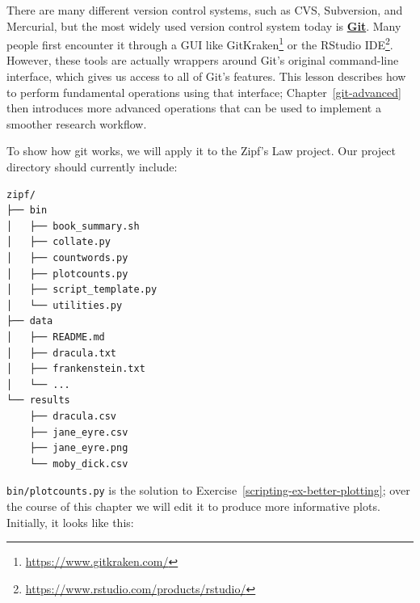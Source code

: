 \documentclass[
]{krantz}
\renewcommand{\href}[2]{#2\footnote{\url{#1}}}
\newcommand{\gref}[2]{\hyperlink{#2}{\textbf{#1}}}
\begin{document}
There are many different version control systems,
such as CVS, Subversion, and Mercurial,
but the most widely used version control system today is \gref{Git}{git}.
Many people first encounter it through a GUI like \href{https://www.gitkraken.com/}{GitKraken}
or \href{https://www.rstudio.com/products/rstudio/}{the RStudio IDE}.
However,
these tools are actually wrappers around Git's original command-line interface,
which gives us access to all of Git's features.
This lesson describes how to perform fundamental operations using that interface;
Chapter~\ref{git-advanced} then introduces more advanced operations
that can be used to implement a smoother research workflow.

To show how git works,
we will apply it to the Zipf's Law project.
Our project directory should currently include:

\begin{verbatim}
zipf/
├── bin
│   ├── book_summary.sh
│   ├── collate.py
│   ├── countwords.py
│   ├── plotcounts.py
│   ├── script_template.py
│   └── utilities.py
├── data
│   ├── README.md
│   ├── dracula.txt
│   ├── frankenstein.txt
│   └── ...
└── results
    ├── dracula.csv
    ├── jane_eyre.csv
    ├── jane_eyre.png
    └── moby_dick.csv
\end{verbatim}

\texttt{bin/plotcounts.py} is the solution to Exercise~\ref{scripting-ex-better-plotting};
over the course of this chapter
we will edit it to produce more informative plots.
Initially,
it looks like this:
\end{document}
